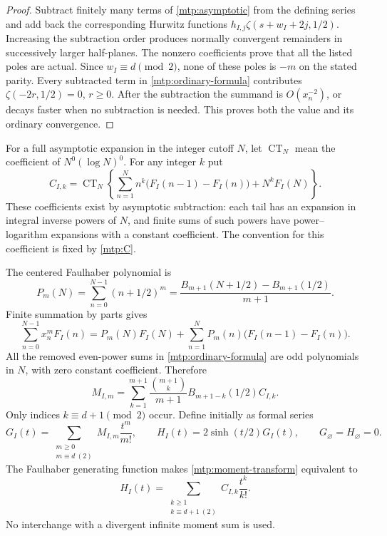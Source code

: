 \documentclass[11pt,letterpaper]{article}
\numberwithin{equation}{section}
\theoremstyle{definition}
\theoremstyle{remark}
\begin{document}
\begin{proof}
Subtract finitely many terms of \eqref{mtp:asymptotic} from the defining
series and add back the corresponding Hurwitz functions
$h_{I,j}\zeta(s+w_I+2j,1/2)$. Increasing the subtraction order produces
normally convergent remainders in successively larger half-planes.
The nonzero coefficients prove that all the listed poles are actual.
Since $w_I\equiv d\pmod2$, none of these poles is $-m$ on the stated
parity. Every subtracted term in \eqref{mtp:ordinary-formula} contributes
$\zeta(-2r,1/2)=0$, $r\ge0$. After the subtraction the summand is
$O(x_n^{-2})$, or decays faster when no subtraction is needed.
This proves both the value and its ordinary convergence.
\end{proof}

For a full asymptotic expansion in the integer cutoff $N$, let
$\operatorname{CT}_N$ mean the coefficient of $N^0(\log N)^0$.
For any integer $k$ put
\begin{equation}\label{mtp:C}
 C_{I,k}=\operatorname{CT}_N\left\{
     \sum_{n=1}^N n^k\bigl(F_I(n-1)-F_I(n)\bigr)+N^kF_I(N)\right\}.
\end{equation}
These coefficients exist by asymptotic subtraction: each tail has an
expansion in integral inverse powers of $N$, and finite sums of such
powers have power--logarithm expansions with a constant coefficient.
The convention for this coefficient is fixed by \eqref{mtp:C}.

The centered Faulhaber polynomial is
\[
 P_m(N)=\sum_{n=0}^{N-1}(n+1/2)^m
       =\frac{B_{m+1}(N+1/2)-B_{m+1}(1/2)}{m+1}.
\]
Finite summation by parts gives
\[
 \sum_{n=0}^{N-1}x_n^mF_I(n)
 =P_m(N)F_I(N)+\sum_{n=1}^NP_m(n)\bigl(F_I(n-1)-F_I(n)\bigr).
\]
All the removed even-power sums in \eqref{mtp:ordinary-formula} are odd
polynomials in $N$, with zero constant coefficient. Therefore
\begin{equation}\label{mtp:moment-transform}
 M_{I,m}=\sum_{k=1}^{m+1}
       \frac{\binom{m+1}{k}}{m+1}B_{m+1-k}(1/2)C_{I,k}.
\end{equation}
Only indices $k\equiv d+1\pmod2$ occur. Define initially as formal series
\begin{equation}\label{mtp:GH}
 G_I(t)=\sum_{\substack{m\ge0\\m\equiv d\ (2)}}M_{I,m}\frac{t^m}{m!},
 \qquad H_I(t)=2\sinh(t/2)G_I(t),\qquad G_\varnothing=H_\varnothing=0.
\end{equation}
The Faulhaber generating function makes \eqref{mtp:moment-transform}
equivalent to
\begin{equation}\label{mtp:HC}
 H_I(t)=\sum_{\substack{k\ge1\\k\equiv d+1\ (2)}}C_{I,k}\frac{t^k}{k!}.
\end{equation}
No interchange with a divergent infinite moment sum is used.
\end{document}
